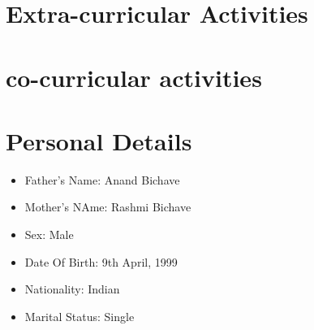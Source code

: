 \documentclass[10pt]{article}
\begin{document}
\section{Extra-curricular Activities}



\section{co-curricular activities}



\section{Personal Details} 
\begin{itemize}

\item{Father's Name: Anand Bichave}
\item{Mother's NAme: Rashmi Bichave}
\item{Sex: Male}
\item{Date Of Birth: 9th April, 1999}
\item{Nationality: Indian}
\item{Marital Status: Single}

\end{itemize}
\end{document}
